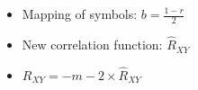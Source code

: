 \documentclass{beamer}
\begin{document}
\begin{frame}
\begin{minipage}{.5\linewidth}
			\begin{itemize}
				\item Mapping of symbols: $b = \frac{1 - r}{2}$
				\item New correlation function: $\hat{R}_{XY}$
				\item $R_{XY} = -m - 2 \times \hat{R}_{XY}$ %
			\end{itemize}


		\end{minipage}

	\end{frame}







\end{document}
